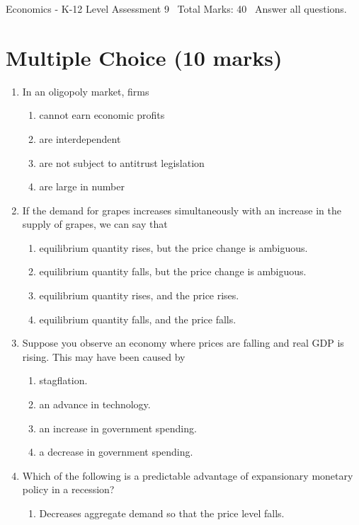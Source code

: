 \documentclass[12pt]{article}
\begin{document}
\begin{center}
Economics - K-12 Level Assessment 9 \
Total Marks: 40 \
Answer all questions.
\end{center}

\section*{Multiple Choice (10 marks)}
\begin{enumerate}[label=\arabic*.]
\item In an oligopoly market, firms
\begin{enumerate}[label=(\alph*)]
    \item cannot earn economic profits
    \item are interdependent
    \item are not subject to antitrust legislation
    \item are large in number
\end{enumerate}
\item If the demand for grapes increases simultaneously with an increase in the supply of grapes, we can say that
\begin{enumerate}[label=(\alph*)]
    \item equilibrium quantity rises, but the price change is ambiguous.
    \item equilibrium quantity falls, but the price change is ambiguous.
    \item equilibrium quantity rises, and the price rises.
    \item equilibrium quantity falls, and the price falls.
\end{enumerate}
\item Suppose you observe an economy where prices are falling and real GDP is rising. This may have been caused by
\begin{enumerate}[label=(\alph*)]
    \item stagflation.
    \item an advance in technology.
    \item an increase in government spending.
    \item a decrease in government spending.
\end{enumerate}
\item Which of the following is a predictable advantage of expansionary monetary policy in a recession?
\begin{enumerate}[label=(\alph*)]
    \item Decreases aggregate demand so that the price level falls.

\end{enumerate}
\end{enumerate}
\end{document}
